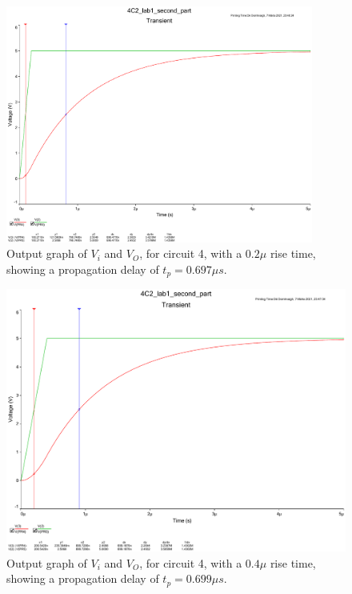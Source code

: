 \documentclass[11pt, a4paper]{article}
\begin{document}
\begin{figure}[h!]
  \centering
  \includegraphics[width=0.9\textwidth]{report/img/question_4/rise_time_02u.pdf}
  \caption{\centering Output graph of $V_i$ and $V_O$, for circuit 4, with a $0.2\mu$ rise time, showing a propagation delay of $t_p = 0.697 \mu s$.}
    \label{fig:2rt}
\end{figure}

\begin{figure}
  \centering
  \includegraphics[width=\textwidth]{report/img/question_4/rise_time_04u.pdf}
  \caption{\centering Output graph of $V_i$ and $V_O$, for circuit 4, with a $0.4\mu$ rise time, showing a propagation delay of $t_p = 0.699 \mu s$.}
    \label{fig:4rt}
\end{figure}
\end{document}
